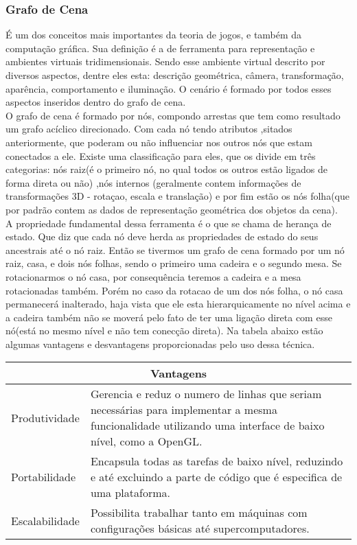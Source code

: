\subsubsection{Grafo de Cena}
É um dos conceitos mais importantes da teoria de jogos, e também da computação gráfica. Sua definição é a de ferramenta para representação e ambientes virtuais tridimensionais. Sendo esse ambiente virtual descrito por diversos aspectos, dentre eles esta: descrição geométrica, câmera, transformação, aparência, comportamento e iluminação\cite{ferreira}. O cenário é formado por todos esses aspectos inseridos dentro do grafo de cena. \\

O grafo de cena é formado por nós, compondo arrestas que tem como resultado um grafo acíclico direcionado. Com cada nó tendo atributos ,sitados anteriormente, que poderam ou não influenciar nos outros nós que estam conectados a ele. Existe uma classificação para eles, que os divide em três categorias: nós raiz(é o primeiro nó, no qual todos os outros estão ligados de forma direta ou não) ,nós internos (geralmente contem informações de transformações 3D - rotaçao, escala e translação) e por fim estão os nós folha(que por padrão contem as dados de representação geométrica dos objetos da cena).\\ 

A propriedade fundamental dessa ferramenta é o que se chama de herança de estado. Que diz que cada nó deve herda as propriedades de estado do seus ancestrais até o nó raiz. Então se tivermos um grafo de cena formado por um nó raiz, casa, e dois nós folhas, sendo o primeiro uma cadeira e o segundo mesa. Se rotacionarmos o nó casa, por consequência teremos a cadeira e a mesa rotacionadas também. Porém no caso da rotacao de um dos nós folha, o nó casa permanecerá inalterado, haja vista que ele esta hierarquicamente no nível acima e a cadeira também não se moverá pelo fato de ter uma ligação direta com esse nó(está no mesmo nível e não tem conecção direta). Na tabela abaixo estão algumas vantagens e desvantagens proporcionadas pelo uso dessa técnica.\\

\begin{center}
\begin{tabular}{|p{3cm}|p{8cm}|}
    \hline
    \multicolumn{2}{|c|}{Vantagens} \\ \hline
    Produtividade &  Gerencia e reduz o numero de linhas que seriam necessárias para implementar
                     a mesma funcionalidade utilizando uma interface de baixo nível, como a OpenGL.\\ \hline
    Portabilidade &  Encapsula todas as tarefas de baixo nível, reduzindo e até 
                     excluindo a parte de código que é especifica de uma plataforma.\\ \hline
    Escalabilidade &  Possibilita trabalhar tanto em máquinas com configurações básicas até supercomputadores.\\ 
    \hline
\end{tabular}
\end{center}


